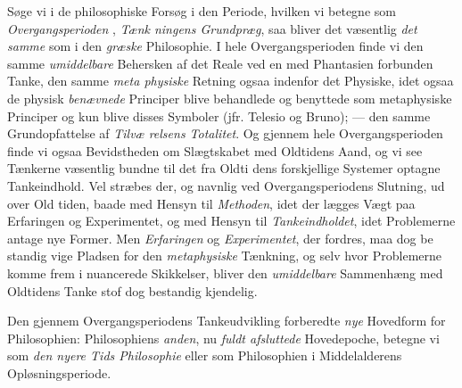 Søge vi i de philosophiske Forsøg i den Periode, hvilken
vi betegne som \emph{Overgangsperioden} , \emph{Tænk\-%
ningens Grundpræg}, saa bliver det væsentlig \emph{det samme}
som i den \emph{græske} Philosophie. I hele Overgangsperioden
finde vi den samme \emph{umiddelbare} Behersken af det Reale
ved en med Phantasien forbunden Tanke, den samme \emph{meta\-%
physiske} Retning ogsaa indenfor det Physiske, idet ogsaa de
physisk \emph{benævnede} Principer blive behandlede og benyttede
som metaphysiske Principer og kun blive disses Symboler (jfr.
 Telesio og Bruno); --- den samme Grundopfattelse af \emph{Tilvæ\-%
relsens Totalitet}. Og gjennem hele Overgangsperioden
finde vi ogsaa Bevidstheden om Slægtskabet med Oldtidens
Aand, og vi see Tænkerne væsentlig bundne til det fra Oldti\-%
dens forskjellige Systemer optagne Tankeindhold. Vel stræbes
der, og navnlig ved Overgangsperiodens Slutning, ud over Old\-%
tiden, baade med Hensyn til \emph{Methoden}, idet der lægges
Vægt paa Erfaringen og Experimentet, og med Hensyn til
\emph{Tankeindholdet}, idet Problemerne antage nye Former. Men
\emph{Erfaringen} og \emph{Experimentet}, der fordres, maa dog be\-%
standig vige Pladsen for den \emph{metaphysiske} Tænkning, og
selv hvor Problemerne komme frem i nuancerede Skikkelser,
bliver den \emph{umiddelbare} Sammenhæng med Oldtidens Tanke\-%
stof dog bestandig kjendelig.

Den gjennem Overgangsperiodens Tankeudvikling forberedte
\emph{nye} Hovedform for Philosophien: Philosophiens \emph{anden}, nu
\emph{fuldt afsluttede} Hovedepoche, betegne vi som \emph{den nyere
Tids Philosophie} eller som Philosophien i Middelalderens
Opløsningsperiode.

